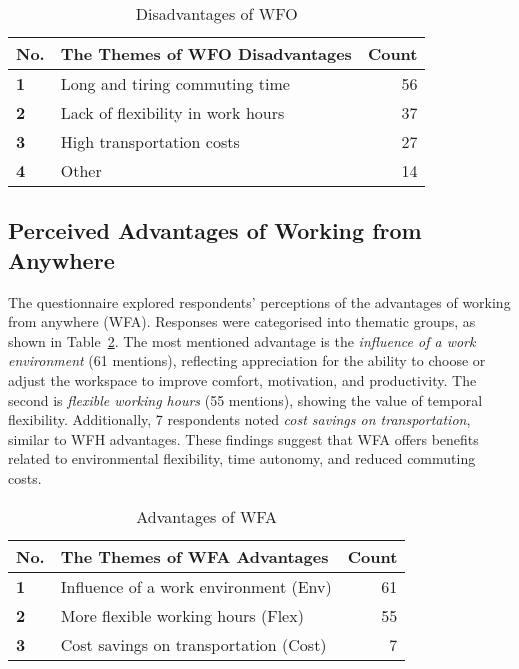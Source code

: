 \documentclass{infotel}
\begin{document}
\renewcommand{\arraystretch}{1.3}
\begin{table}
	\centering
	\caption{Disadvantages of WFO}
	\label{Disadvantages of WFO}
	\begin{tabular}{p{} p{} r}
		\hline
		\textbf{No.} & \textbf{The Themes of WFO Disadvantages} & \textbf{Count} \\ 
		\hline
		\textbf{1} & Long and tiring commuting time & 56 \\ 
		\textbf{2} & Lack of flexibility in work hours & 37 \\ 
		\textbf{3} & High transportation costs & 27 \\ 
		\textbf{4} & Other & 14 \\ 
		\hline
	\end{tabular}
\end{table}



\subsection{Perceived Advantages of Working from Anywhere}
\label{sec:advantage-wfa}

The questionnaire explored respondents' perceptions of the advantages of working from anywhere (WFA). Responses were categorised into thematic groups, as shown in Table~\ref{Advantages of WFA}. The most mentioned advantage is the \textit{influence of a work environment} (61 mentions), reflecting appreciation for the ability to choose or adjust the workspace to improve comfort, motivation, and productivity. The second is \textit{flexible working hours} (55 mentions), showing the value of temporal flexibility. Additionally, 7 respondents noted \textit{cost savings on transportation}, similar to WFH advantages. These findings suggest that WFA offers benefits related to environmental flexibility, time autonomy, and reduced commuting costs.


\renewcommand{\arraystretch}{1.3}
\begin{table}
	\centering
	\caption{Advantages of WFA}
	\label{Advantages of WFA}
	\begin{tabular}{p{} p{} r}
		\hline
		\textbf{No.} & \textbf{The Themes of WFA Advantages} & \textbf{Count} \\ 
		\hline
		\textbf{1} & Influence of a work environment (Env) & 61 \\ 
		\textbf{2} & More flexible working hours (Flex) & 55 \\ 
		\textbf{3} & Cost savings on transportation (Cost) & 7 \\ 
		\hline
	\end{tabular}
\end{table}
\end{document}
